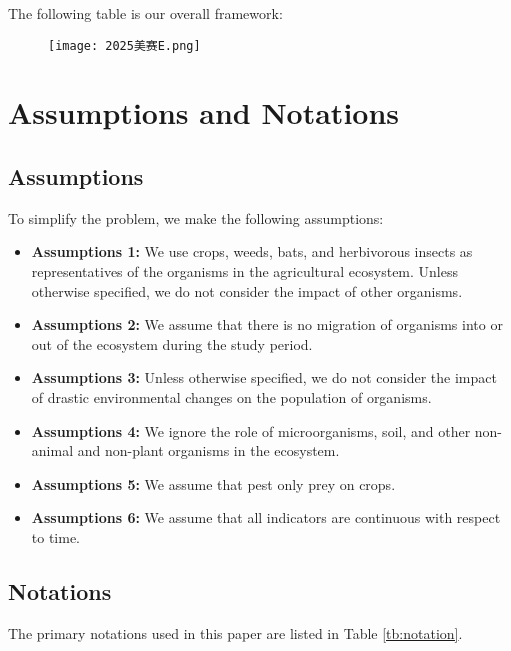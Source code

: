 \documentclass[12pt]{article}  %
\begin{document}
The following table is our overall framework:

\begin{figure}[h]
    \centering
    \texttt{[image: 2025美赛E.png]}
    \label{fig:framework}
\end{figure}




\section{Assumptions and Notations}
\subsection{Assumptions}
To simplify the problem, we make the following assumptions:
\begin{itemize}
    \item\textbf{Assumptions 1:} We use crops, weeds, bats, and 
    herbivorous insects as representatives of the organisms in the 
    agricultural ecosystem. Unless otherwise specified, we do not 
    consider the impact of other organisms.
    \item\textbf{Assumptions 2:} We assume that there is no migration 
    of organisms into or out of the ecosystem during the study period.
    \item\textbf{Assumptions 3:} Unless otherwise specified, we do not 
    consider the impact of drastic environmental changes on the population 
    of organisms.
    \item\textbf{Assumptions 4:} We ignore the role of microorganisms, 
    soil, and other non-animal and non-plant organisms in the ecosystem.
    \item\textbf{Assumptions 5:} We assume that pest only prey on crops.
    \item\textbf{Assumptions 6:} We assume that all indicators are 
    continuous with respect to time.
\end{itemize}
\subsection{Notations}
The primary notations used in this paper are listed in Table \ref{tb:notation}.
\end{document}

